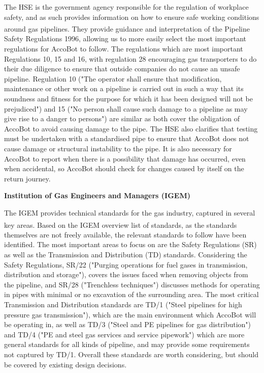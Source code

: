 \documentclass[11pt]{article}		%
\newcommand{\supercite}[1]{\textsuperscript{\cite{#1}}}		%
\begin{document}
			The HSE is the government agency responsible for the regulation of workplace safety, and as such provides information on how to ensure safe working conditions around gas pipelines.
			They provide guidance and interpretation\supercite{hse1996guide} of the Pipeline Safety Regulations 1996, allowing us to more easily select the most important regulations for AccoBot to follow.
			The regulations which are most important Regulations 10, 15 and 16, with regulation 28 encouraging gas transporters to do their due diligence to ensure that outside companies do not cause an unsafe pipeline.
			Regulation 10 ("The operator shall ensure that modification, maintenance or other work on a pipeline is carried out in such a way that its soundness and fitness for the purpose for which it has been designed will not be prejudiced") and 15 ("No person shall cause such damage to a pipeline as may give rise to a danger to persons") are similar as both cover the obligation of AccoBot to avoid causing damage to the pipe.
			The HSE also clarifies that testing must be undertaken with a standardised pipe to ensure that AccoBot does not cause damage or structural instability to the pipe.
			It is also necessary for AccoBot to report when there is a possibility that damage has occurred, even when accidental, so AccoBot should check for changes caused by itself on the return journey.
			
			\textbf{Institution of Gas Engineers and Managers (IGEM)}
			
			The IGEM provides technical standards for the gas industry, captured in several key areas.
			Based on the IGEM overview list of standards\supercite{institution2021igem}, as the standards themselves are not freely available, the relevant standards to follow have been identified.
			The most important areas to focus on are the Safety Regulations (SR) as well as the Transmission and Distribution (TD) standards.
			Considering the Safety Regulations, SR/22 ("Purging operations for fuel gases in transmission, distribution and storage"), covers the issues faced when removing objects from the pipeline, and SR/28 ("Trenchless techniques") discusses methods for operating in pipes with minimal or no excavation of the surrounding area.
			The most critical Transmission and Distribution standards are TD/1 ("Steel pipelines for high pressure gas transmission"), which are the main environment which AccoBot will be operating in, as well as TD/3 ("Steel and PE pipelines for gas distribution") and TD/4 ("PE and steel gas services and service pipework") which are more general standards for all kinds of pipeline, and may provide some requirements not captured by TD/1.
			Overall these standards are worth considering, but should be covered by existing design decisions.
			
\end{document}
